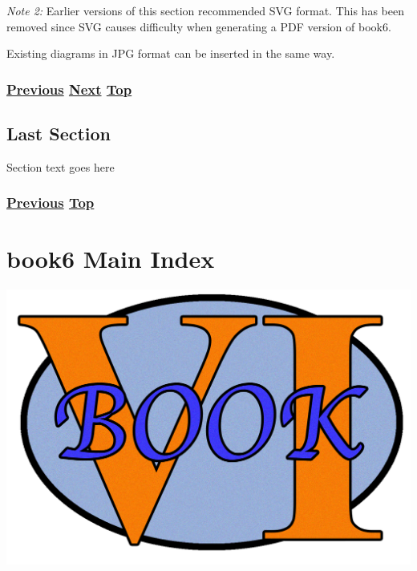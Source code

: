 \documentclass[
]{article}
\begin{document}
\emph{Note 2:} Earlier versions of this section recommended SVG format.
This has been removed since SVG causes difficulty when generating a PDF
version of book6.

Existing diagrams in JPG format can be inserted in the same way.

\subsubsection{\texorpdfstring{\hyperref[section-template]{Previous}
\hyperref[last-section]{Next}
\hyperref[chapter-template]{Top}}{Previous Next Top}}\label{previous-next-top-31}

\pagebreak

\subsection{Last Section}\label{last-section}

Section text goes here

\subsubsection{\texorpdfstring{\hyperref[markdown-usage]{Previous}
\hyperref[chapter-template]{Top}}{Previous Top}}\label{previous-top-7}

\pagebreak

\section{book6 Main Index}\label{book6-main-index}

\includegraphics{book6logo.png}
\end{document}
